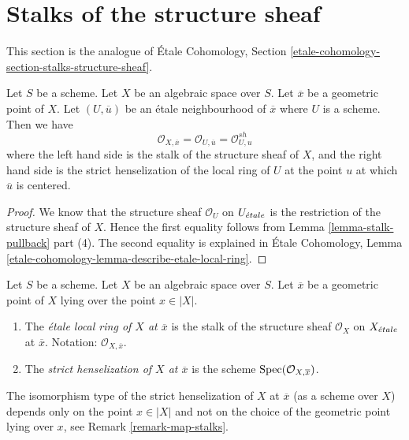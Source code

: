 \section{Stalks of the structure sheaf}
\label{section-stalks-structure-sheaf}

\noindent
This section is the analogue of
\'Etale Cohomology, Section
\ref{etale-cohomology-section-stalks-structure-sheaf}.

\begin{lemma}
\label{lemma-describe-etale-local-ring}
Let $S$ be a scheme.
Let $X$ be an algebraic space over $S$.
Let $\overline{x}$ be a geometric point of $X$.
Let $(U, \overline{u})$ be an \'etale neighbourhood of $\overline{x}$
where $U$ is a scheme. Then we have
$$
\mathcal{O}_{X, \overline{x}} =
\mathcal{O}_{U, \overline{u}} =
\mathcal{O}_{U, u}^{sh}
$$
where the left hand side is the stalk of the structure sheaf of $X$,
and the right hand side is the strict henselization of the local ring
of $U$ at the point $u$ at which $\overline{u}$ is centered.
\end{lemma}

\begin{proof}
We know that the structure sheaf $\mathcal{O}_U$ on
$U_{\acute{e}tale}$ is the restriction of the structure sheaf of $X$.
Hence the first equality follows from
Lemma \ref{lemma-stalk-pullback} part (4).
The second equality is explained in
\'Etale Cohomology,
Lemma \ref{etale-cohomology-lemma-describe-etale-local-ring}.
\end{proof}

\begin{definition}
\label{definition-etale-local-rings}
Let $S$ be a scheme.
Let $X$ be an algebraic space over $S$.
Let $\overline{x}$ be a geometric point of $X$ lying over the point
$x \in |X|$.
\begin{enumerate}
\item The {\it \'etale local ring of $X$ at $\overline{x}$}
is the stalk of the structure sheaf $\mathcal{O}_X$ on $X_{\acute{e}tale}$
at $\overline{x}$.
Notation: $\mathcal{O}_{X, \overline{x}}$.
\item The {\it strict henselization of $X$ at $\overline{x}$}
is the scheme $\mathop{\mathrm{Spec}}(\mathcal{O}_{X, \overline{x}})$.
\end{enumerate}
\end{definition}

\noindent
The isomorphism type of the strict henselization of $X$ at $\overline{x}$
(as a scheme over $X$) depends only on the point $x \in |X|$ and not on
the choice of the geometric point lying over $x$, see
Remark \ref{remark-map-stalks}.

